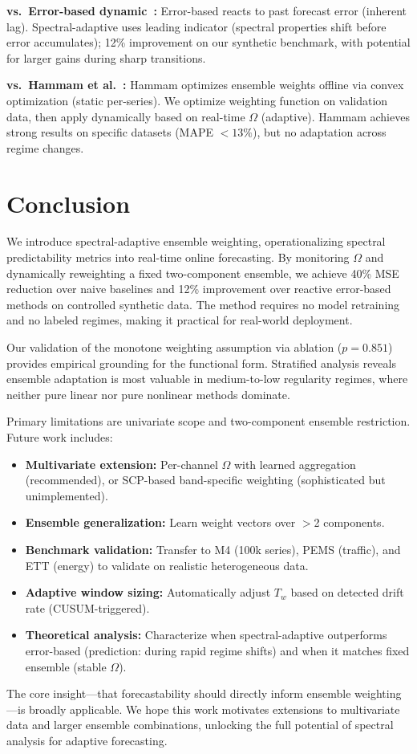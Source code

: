 \documentclass[11pt,letterpaper]{article}
\begin{document}
\textbf{vs.~Error-based dynamic~\cite{Sun2017}:} Error-based reacts to past forecast error (inherent lag). Spectral-adaptive uses leading indicator (spectral properties shift before error accumulates); 12\% improvement on our synthetic benchmark, with potential for larger gains during sharp transitions.

\textbf{vs.~Hammam et al.~\cite{Hammam2025}:} Hammam optimizes ensemble weights offline via convex optimization (static per-series). We optimize weighting function on validation data, then apply dynamically based on real-time $\Omega$ (adaptive). Hammam achieves strong results on specific datasets (MAPE $< 13\%$), but no adaptation across regime changes.

\section{Conclusion}

We introduce spectral-adaptive ensemble weighting, operationalizing spectral predictability metrics into real-time online forecasting. By monitoring $\Omega$ and dynamically reweighting a fixed two-component ensemble, we achieve 40\% MSE reduction over naive baselines and 12\% improvement over reactive error-based methods on controlled synthetic data. The method requires no model retraining and no labeled regimes, making it practical for real-world deployment.

Our validation of the monotone weighting assumption via ablation ($p = 0.851$) provides empirical grounding for the functional form. Stratified analysis reveals ensemble adaptation is most valuable in medium-to-low regularity regimes, where neither pure linear nor pure nonlinear methods dominate.

Primary limitations are univariate scope and two-component ensemble restriction. Future work includes:
\begin{itemize}
  \item \textbf{Multivariate extension:} Per-channel $\Omega$ with learned aggregation (recommended), or SCP-based band-specific weighting (sophisticated but unimplemented).
  \item \textbf{Ensemble generalization:} Learn weight vectors over $>$2 components.
  \item \textbf{Benchmark validation:} Transfer to M4 (100k series), PEMS (traffic), and ETT (energy) to validate on realistic heterogeneous data.
  \item \textbf{Adaptive window sizing:} Automatically adjust $T_w$ based on detected drift rate (CUSUM-triggered).
  \item \textbf{Theoretical analysis:} Characterize when spectral-adaptive outperforms error-based (prediction: during rapid regime shifts) and when it matches fixed ensemble (stable $\Omega$).
\end{itemize}

The core insight---that forecastability should directly inform ensemble weighting---is broadly applicable. We hope this work motivates extensions to multivariate data and larger ensemble combinations, unlocking the full potential of spectral analysis for adaptive forecasting.



\end{document}
